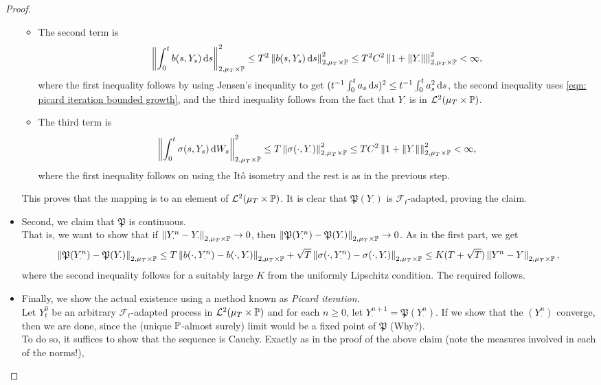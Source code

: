 \begin{proof}
\begin{itemize}
\begin{itemize}
				\item The second term is
				\[ \left\lVert\int_0^t b(s,Y_s)\operatorname{d}\!{s}\right\rVert^2_{2,\mu_T\times\mathbb{P}} \leq T^2 \left\lVert b(s,Y_s)\operatorname{d}\!{s}\right\rVert^2_{2,\mu_T\times\mathbb{P}} \leq T^2C^2 \left\lVert1+\left\lVert Y_\cdot\right\rVert\right\rVert^2_{2,\mu_T\times\mathbb{P}} < \infty, \]
				where the first inequality follows by using Jensen's inequality to get $(t^{-1}\int_0^t a_s\operatorname{d}\!{s})^2 \leq t^{-1}\int_0^t a_s^2\operatorname{d}\!{s}$, the second inequality uses \eqref{eqn: picard iteration bounded growth}, and the third inequality follows from the fact that $Y_\cdot$ is in $\mathcal{L}^2(\mu_T\times\mathbb{P})$.
				\item The third term is
				\[ \left\lVert\int_0^t \sigma(s,Y_s)\operatorname{d}\!{W}_s\right\rVert^2_{2,\mu_T\times\mathbb{P}} \leq T \left\lVert\sigma(\cdot,Y_\cdot)\right\rVert^2_{2,\mu_T\times\mathbb{P}} \leq TC^2\left\lVert1+\left\lVert Y_\cdot\right\rVert\right\rVert^2_{2,\mu_T\times\mathbb{P}} < \infty, \]
				where the first inequality follows on using the It\^{o} isometry and the rest is as in the previous step.
			\end{itemize}
			This proves that the mapping is to an element of $\mathcal{L}^2(\mu_T\times\mathbb{P})$. It is clear that $\mathfrak{P}(Y_\cdot)$ is $\mathcal{F}_t$-adapted, proving the claim.
		\item Second, we claim that $\mathfrak{P}$ is continuous.\\
			That is, we want to show that if $\left\lVert Y^n_\cdot - Y_\cdot\right\rVert_{2,\mu_T\times\mathbb{P}}\to 0$, then $\left\lVert\mathfrak{P}(Y^n_\cdot) - \mathfrak{P}(Y_\cdot)\right\rVert_{2,\mu_T\times\mathbb{P}}\to 0$. As in the first part, we get
			\[ \left\lVert\mathfrak{P}(Y^n_\cdot) - \mathfrak{P}(Y_\cdot)\right\rVert_{2,\mu_T\times\mathbb{P}} \leq T \left\lVert b(\cdot,Y^n_\cdot) - b(\cdot,Y_\cdot)\right\rVert_{2,\mu_T\times\mathbb{P}} + \sqrt{T} \left\lVert\sigma(\cdot,Y^n_\cdot) - \sigma(\cdot,Y_\cdot)\right\rVert_{2,\mu_T\times\mathbb{P}} \leq K(T+\sqrt{T})\left\lVert Y^n - Y\right\rVert_{2,\mu_T\times\mathbb{P}}, \]
			where the second inequality follows for a suitably large $K$ from the uniformly Lipschitz condition. The required follows.
		\item Finally, we show the actual existence using a method known as \textit{Picard iteration}.\\
			Let $Y^0_t$ be an arbitrary $\mathcal{F}_t$-adapted process in $\mathcal{L}^2(\mu_T\times\mathbb{P})$ and for each $n\geq 0$, let $Y^{n+1}_\cdot = \mathfrak{P}(Y^n_\cdot)$. If we show that the $(Y^n_\cdot)$ converge, then we are done, since the (unique $\mathbb{P}$-almost surely) limit would be a fixed point of $\mathfrak{P}$ (Why?).\\
			To do so, it suffices to show that the sequence is Cauchy. Exactly as in the proof of the above claim (note the measures involved in each of the norms!),

\end{itemize}
\end{proof}
